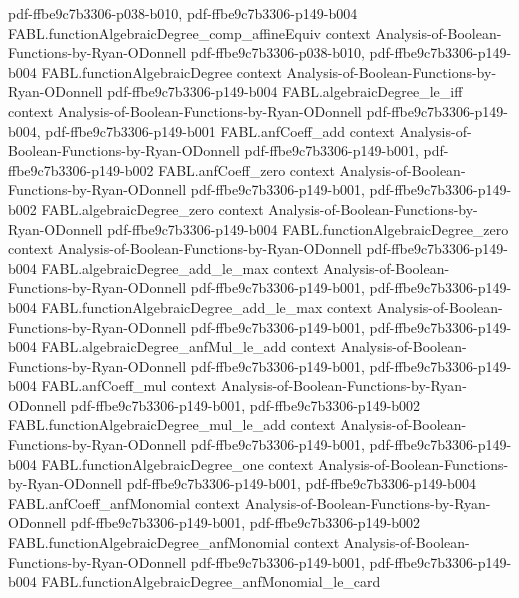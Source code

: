\begin{theorem}
  {pdf-ffbe9c7b3306-p038-b010,
    pdf-ffbe9c7b3306-p149-b004}
\proofstep
  {FABL.functionAlgebraicDegree_comp_affineEquiv}
  {context}
  {Analysis-of-Boolean-Functions-by-Ryan-ODonnell}
  {pdf-ffbe9c7b3306-p038-b010,
    pdf-ffbe9c7b3306-p149-b004}
\proofstep
  {FABL.functionAlgebraicDegree}
  {context}
  {Analysis-of-Boolean-Functions-by-Ryan-ODonnell}
  {pdf-ffbe9c7b3306-p149-b004}
\proofstep
  {FABL.algebraicDegree_le_iff}
  {context}
  {Analysis-of-Boolean-Functions-by-Ryan-ODonnell}
  {pdf-ffbe9c7b3306-p149-b004,
    pdf-ffbe9c7b3306-p149-b001}
\proofstep
  {FABL.anfCoeff_add}
  {context}
  {Analysis-of-Boolean-Functions-by-Ryan-ODonnell}
  {pdf-ffbe9c7b3306-p149-b001,
    pdf-ffbe9c7b3306-p149-b002}
\proofstep
  {FABL.anfCoeff_zero}
  {context}
  {Analysis-of-Boolean-Functions-by-Ryan-ODonnell}
  {pdf-ffbe9c7b3306-p149-b001,
    pdf-ffbe9c7b3306-p149-b002}
\proofstep
  {FABL.algebraicDegree_zero}
  {context}
  {Analysis-of-Boolean-Functions-by-Ryan-ODonnell}
  {pdf-ffbe9c7b3306-p149-b004}
\proofstep
  {FABL.functionAlgebraicDegree_zero}
  {context}
  {Analysis-of-Boolean-Functions-by-Ryan-ODonnell}
  {pdf-ffbe9c7b3306-p149-b004}
\proofstep
  {FABL.algebraicDegree_add_le_max}
  {context}
  {Analysis-of-Boolean-Functions-by-Ryan-ODonnell}
  {pdf-ffbe9c7b3306-p149-b001,
    pdf-ffbe9c7b3306-p149-b004}
\proofstep
  {FABL.functionAlgebraicDegree_add_le_max}
  {context}
  {Analysis-of-Boolean-Functions-by-Ryan-ODonnell}
  {pdf-ffbe9c7b3306-p149-b001,
    pdf-ffbe9c7b3306-p149-b004}
\proofstep
  {FABL.algebraicDegree_anfMul_le_add}
  {context}
  {Analysis-of-Boolean-Functions-by-Ryan-ODonnell}
  {pdf-ffbe9c7b3306-p149-b001,
    pdf-ffbe9c7b3306-p149-b004}
\proofstep
  {FABL.anfCoeff_mul}
  {context}
  {Analysis-of-Boolean-Functions-by-Ryan-ODonnell}
  {pdf-ffbe9c7b3306-p149-b001,
    pdf-ffbe9c7b3306-p149-b002}
\proofstep
  {FABL.functionAlgebraicDegree_mul_le_add}
  {context}
  {Analysis-of-Boolean-Functions-by-Ryan-ODonnell}
  {pdf-ffbe9c7b3306-p149-b001,
    pdf-ffbe9c7b3306-p149-b004}
\proofstep
  {FABL.functionAlgebraicDegree_one}
  {context}
  {Analysis-of-Boolean-Functions-by-Ryan-ODonnell}
  {pdf-ffbe9c7b3306-p149-b001,
    pdf-ffbe9c7b3306-p149-b004}
\proofstep
  {FABL.anfCoeff_anfMonomial}
  {context}
  {Analysis-of-Boolean-Functions-by-Ryan-ODonnell}
  {pdf-ffbe9c7b3306-p149-b001,
    pdf-ffbe9c7b3306-p149-b002}
\proofstep
  {FABL.functionAlgebraicDegree_anfMonomial}
  {context}
  {Analysis-of-Boolean-Functions-by-Ryan-ODonnell}
  {pdf-ffbe9c7b3306-p149-b001,
    pdf-ffbe9c7b3306-p149-b004}
\proofstep
  {FABL.functionAlgebraicDegree_anfMonomial_le_card}

\end{theorem}
